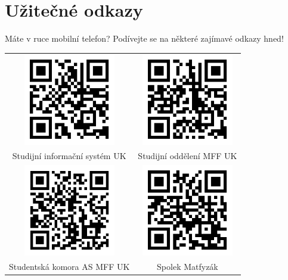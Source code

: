 \newpage
{}
\section*{Užitečné odkazy}
Máte v ruce mobilní telefon? Podívejte se na některé zajímavé odkazy hned!


\begin{tabular}{cc}
    \includegraphics[width=4cm]{Images/QR/is.png}&
    \includegraphics[width=4cm]{Images/QR/studijni.png} \\
    Studijní informační systém UK&
    Studijní oddělení MFF UK \\
    
    \includegraphics[width=4cm]{Images/QR/skas.png}&
    \includegraphics[width=4cm]{Images/QR/matfyzak.png} \\
    Studentská komora AS MFF UK &
    Spolek Matfyzák \\


\end{tabular}
